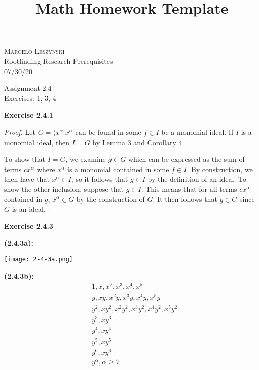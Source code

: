 \documentclass[12pt,oneside]{article}
\newenvironment{exercise}[1]{\vspace{.1in}\noindent\textbf{Exercise #1 \hspace{.05em}}}{}
\begin{document}
\title{Math Homework Template}

\begin{flushright}
\textsc{Marcelo Leszynski}  \\
Rootfinding Research Prerequisites\\
07/30/20
\end{flushright}

\begin{center}
\textsf{Assignment 2.4 } \\
\textsf{Exercises: 1, 3, 4 }
\end{center}


\begin{exercise}{2.4.1}
    \begin{proof}
        Let $G = \langle x^\alpha | x^\alpha \text{ can be found in some }f \in I$
        be a monomial ideal. If $I$ is a monomial ideal, then $I=G$ by Lemma 3 
        and Corollary 4. 

        To show that $I=G$, we examine $g \in G$ which can be expressed as the 
        sum of terms $cx^\alpha$ where $x^\alpha$ is a monomial contained in some 
        $f \in I$. By construction, we then have that $x^\alpha \in I$, so it follows 
        that $g \in I$ by the definition of an ideal. To show the other inclusion, 
        suppose that $g \in I$. This means that for all terms $cx^\alpha$ contained 
        in $g$, $x^\alpha \in G$ by the construction of $G$. It then follows that 
        $g \in G$ since $G$ is an ideal. 
    \end{proof}
\end{exercise}


\begin{exercise}{2.4.3}

    \bigskip
    \textbf{(2.4.3a):}

    \texttt{[image: 2-4-3a.png]}

    \bigskip
    \textbf{(2.4.3b):}
    \begin{align*}
        &1,x,x^2,x^3,x^4,x^5\\
        &y,xy,x^2y,x^3y,x^4y,x^5y\\
        &y^2,xy^2,x^2y^2,x^3y^2,x^4y^2,x^5y^2\\
        &y^3,xy^3\\
        &y^4,xy^4\\
        &y^5,xy^5\\
        &y^6,xy^6\\
        &y^\alpha, \alpha \geq 7
    \end{align*}
\end{exercise}
\end{document}
